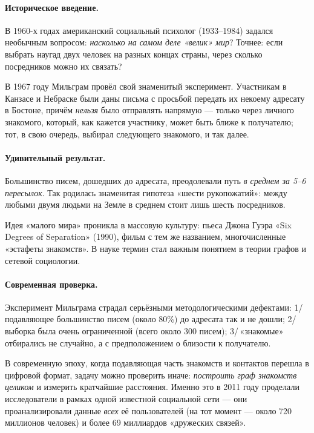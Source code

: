 \paragraph*{Историческое введение.} В 1960-х годах американский социальный психолог  (1933--1984) задался необычным вопросом: \emph{насколько на самом деле «велик» мир}? Точнее: если выбрать наугад двух человек на разных концах страны, через сколько посредников можно их связать?

В 1967 году Мильграм провёл свой знаменитый эксперимент. Участникам в Канзасе и Небраске были даны письма с просьбой передать их некоему адресату в Бостоне, причём \emph{нельзя} было отправлять напрямую --- только через личного знакомого, который, как кажется участнику, может быть ближе к получателю; тот, в свою очередь, выбирал следующего знакомого, и так далее.

\paragraph*{Удивительный результат.} Большинство писем, дошедших до адресата, преодолевали путь \emph{в среднем за 5--6 пересылок}. Так родилась знаменитая гипотеза «шести рукопожатий»: между любыми двумя людьми на Земле в среднем стоит лишь шесть посредников.

\begin{interestbox}[title={Это интересно: «шесть рукопожатий» в литературе}]
Идея «малого мира» проникла в массовую культуру: пьеса Джона Гуэра «Six Degrees of Separation» (1990), фильм с тем же названием, многочисленные «эстафеты знакомств». В науке термин  стал важным понятием в теории графов и сетевой социологии.
\end{interestbox}

\paragraph*{Современная проверка.} Эксперимент Мильграма страдал серьёзными методологическими дефектами: 1/\,подавляющее большинство писем (около 80\%) до адресата так и не дошли; 2/\,выборка была очень ограниченной (всего около 300 писем); 3/\,«знакомые» отбирались не случайно, а с предположением о близости к получателю.

В современную эпоху, когда подавляющая часть знакомств и контактов перешла в цифровой формат, задачу можно проверить иначе: \emph{построить граф знакомств целиком} и измерить кратчайшие расстояния. Именно это в 2011 году проделали исследователи в рамках одной известной социальной сети --- они проанализировали данные \emph{всех} её пользователей (на тот момент --- около 720 миллионов человек) и более 69 миллиардов «дружеских связей».

